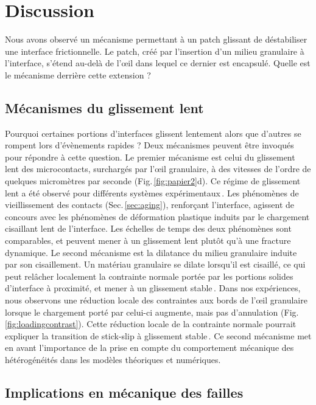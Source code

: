 \section{Discussion}

Nous avons observé un mécanisme permettant à un patch glissant de déstabiliser une interface frictionnelle. Le patch, créé par l'insertion d'un milieu granulaire à l'interface, s'étend au-delà de l'œil dans lequel ce dernier est encapsulé. Quelle est le mécanisme derrière cette extension ?

\subsection{Mécanismes du glissement lent}

Pourquoi certaines portions d'interfaces glissent lentement alors que d'autres se rompent lors d'évènements rapides ? Deux mécanismes peuvent être invoqués pour répondre à cette question. Le premier mécanisme est celui du glissement lent des microcontacts, surchargés par l'œil granulaire, à des vitesses de l'ordre de quelques micromètres par seconde (Fig.\,\ref{fig:papier2}d). Ce régime de glissement lent a été observé pour différents systèmes expérimentaux\,\cite{heslot_creep_1994,rabinowicz_intrinsic_1958}. Les phénomènes de vieillissement des contacts (Sec.\,\ref{sec:aging}), renforçant l'interface, agissent de concours avec les phénomènes de déformation plastique induits par le chargement cisaillant lent de l'interface. Les échelles de temps des deux phénomènes sont comparables, et peuvent mener à un glissement lent plutôt qu'à une fracture dynamique. Le second mécanisme est la dilatance du milieu granulaire induite par son cisaillement. Un matériau granulaire se dilate lorsqu'il est cisaillé, ce qui peut relâcher localement la contrainte normale portée par les portions solides d'interface à proximité, et mener à un glissement stable\,\cite{svetlizky_classical_2014}. Dans nos expériences, nous observons une réduction locale des contraintes aux bords de l'œil granulaire lorsque le chargement porté par celui-ci augmente, mais pas d'annulation (Fig.\,\ref{fig:loadingcontrast}). Cette réduction locale de la contrainte normale pourrait expliquer la transition de stick-slip à glissement stable\,\cite{baumberger_crossover_1994,leeman_laboratory_2016}. Ce second mécanisme met en avant l'importance de la prise en compte du comportement mécanique des hétérogénéités dans les modèles théoriques et numériques.


\subsection{Implications en mécanique des failles}


